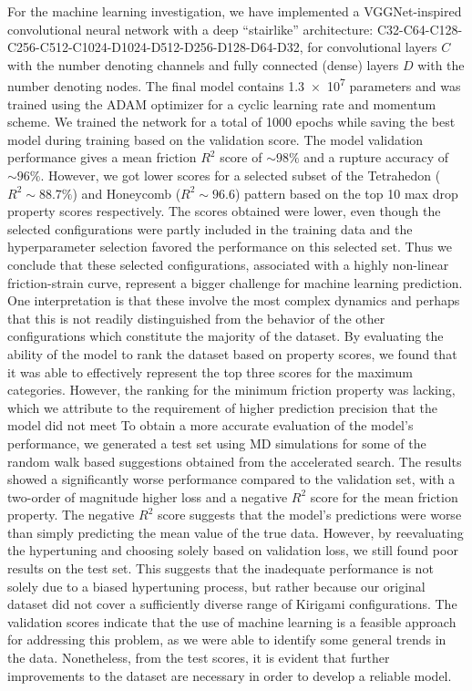 For the machine learning investigation, we have implemented a VGGNet-inspired
convolutional neural network with a deep ``stairlike'' architecture:
C32-C64-C128-C256-C512-C1024-D1024-D512-D256-D128-D64-D32, for convolutional
layers $C$ with the number denoting channels and fully connected (dense) layers
$D$ with the number denoting nodes. The final model contains \num{1.3e7}
parameters and was trained using the ADAM optimizer for a cyclic learning rate
and momentum scheme. We trained the network for a total of 1000 epochs while
saving the best model during training based on the validation score. The model
validation performance gives a mean friction $R^2$ score of $\sim 98\%$ and a
rupture accuracy of $\sim 96 \%$. However, we got lower scores for a selected
subset of the Tetrahedon ($R^2 \sim 88.7 \%$) and Honeycomb ($R^2 \sim 96.6$)
pattern based on the top 10 max drop property scores respectively. The scores
obtained were lower, even though the selected configurations were partly
included in the training data and the hyperparameter selection favored the
performance on this selected set. Thus we conclude that these selected
configurations, associated with a highly non-linear friction-strain curve,
represent a bigger challenge for machine learning prediction. One interpretation
is that these involve the most complex dynamics and perhaps that this is not
readily distinguished from the behavior of the other configurations which
constitute the majority of the dataset. By evaluating the ability of the model
to rank the dataset based on property scores, we found that it was able to
effectively represent the top three scores for the maximum categories. However,
the ranking for the minimum friction property was lacking, which we attribute to
the requirement of higher prediction precision that the model did not meet To
obtain a more accurate evaluation of the model's performance, we generated a
test set using \acrshort{MD} simulations for some of the random walk based
suggestions obtained from the accelerated search. The results showed a
significantly worse performance compared to the validation set, with a two-order
of magnitude higher loss and a negative $R^2$ score for the mean friction
property. The negative $R^2$ score suggests that the model's predictions were
worse than simply predicting the mean value of the true data. However, by
reevaluating the hypertuning and choosing solely based on validation loss, we
still found poor results on the test set. This suggests that the inadequate
performance is not solely due to a biased hypertuning process,  but rather
because our original dataset did not cover a sufficiently diverse range of
Kirigami configurations. The validation scores indicate that the use of machine
learning is a feasible approach for addressing this problem, as we were able to
identify some general trends in the data. Nonetheless, from the test scores, it
is evident that further improvements to the dataset are necessary in order to
develop a reliable model.


